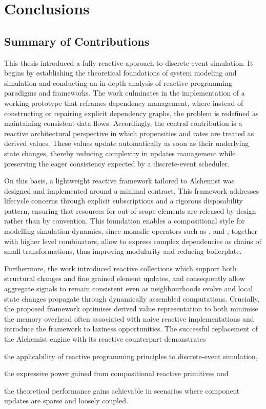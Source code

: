 \chapter{Conclusions}\label{ch:conclusions}
\section{Summary of Contributions}

This thesis introduced a fully reactive approach to discrete-event simulation.
It begins by establishing the theoretical foundations of system modeling and
simulation and conducting an in-depth analysis of reactive programming
paradigms and frameworks. The work culminates in the implementation of a
working prototype that reframes dependency management, where instead of
constructing or repairing explicit dependency graphs, the problem is redefined
as maintaining consistent data flows. Accordingly, the central contribution is
a reactive architectural perspective in which propensities and rates are
treated as derived values. These values update automatically as soon as their
underlying state changes, thereby reducing complexity in updates management
while preserving the eager consistency expected by a discrete-event scheduler.

On this basis, a lightweight reactive framework tailored to Alchemist was
designed and implemented around a minimal  contract. This
framework addresses lifecycle concerns through explicit subscriptions and a
rigorous disposability pattern, ensuring that resources for out-of-scope
elements are released by design rather than by convention. This foundation
enables a compositional style for modelling simulation dynamics, since
monadic operators such as ,  and
, together with higher level combinators, allow to
express complex dependencies as chains of small transformations, thus improving
modularity and reducing boilerplate.

Furthermore, the work introduced reactive collections which support both
structural changes and fine grained element updates, and consequently allow
aggregate signals to remain consistent even as neighbourhoods evolve and local
state changes propagate through dynamically assembled computations. Crucially,
the proposed framework optimises derived value representation to both minimise
the memory overhead often associated with naive reactive implementations and
introduce the framework to laziness opportunities. The successful replacement
of the Alchemist engine with its reactive counterpart demonstrates
\begin{enumerate*}[label=(\roman*)]
	\item the applicability of reactive programming principles to
	      discrete-event simulation,
	\item the expressive power gained from compositional reactive primitives
	      and
	\item the theoretical performance gains achievable in scenarios where
	      component updates are sparse and loosely coupled.
\end{enumerate*}

